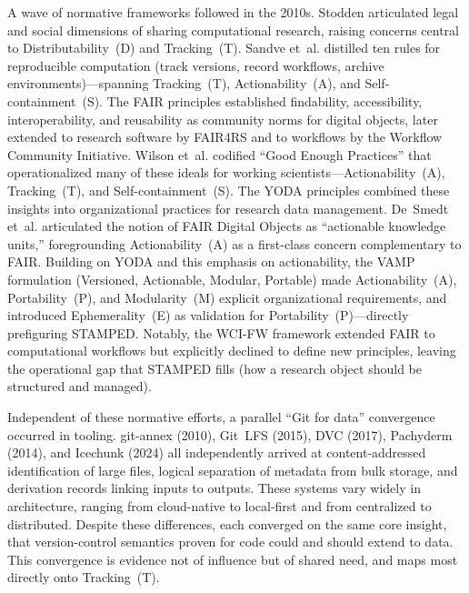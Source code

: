 \documentclass{article}
\begin{document}
A wave of normative frameworks followed in the 2010s.
Stodden\cite{stodden_scientific_2010} articulated legal and social dimensions of sharing computational research, raising concerns central to Distributability~(D) and Tracking~(T).
Sandve et~al.\cite{sandve_ten_2013} distilled ten rules for reproducible computation (track versions, record workflows, archive environments)---spanning Tracking~(T), Actionability~(A), and Self-containment~(S).
The FAIR principles\cite{wilkinson_fair_2016} established findability, accessibility, interoperability, and reusability as community norms for digital objects, later extended to research software by FAIR4RS\cite{barker_introducing_2022} and to workflows by the Workflow Community Initiative\cite{wilkinson_applying_2025}.
Wilson et~al.\cite{wilson_good_2017} codified ``Good Enough Practices'' that operationalized many of these ideals for working scientists---Actionability~(A), Tracking~(T), and Self-containment~(S).
The YODA principles\cite{hanke_yoda_2018} combined these insights into organizational practices for research data management.
De~Smedt et~al.\cite{de_smedt_fair_2020} articulated the notion of FAIR Digital Objects as ``actionable knowledge units,'' foregrounding Actionability~(A) as a first-class concern complementary to FAIR.
Building on YODA and this emphasis on actionability, the VAMP formulation\cite{hanke_what_2023} (Versioned, Actionable, Modular, Portable) made Actionability~(A), Portability~(P), and Modularity~(M) explicit organizational requirements, and introduced Ephemerality~(E) as validation for Portability~(P)---directly prefiguring STAMPED.
Notably, the WCI-FW framework\cite{wilkinson_applying_2025} extended FAIR to computational workflows but explicitly declined to define new principles, leaving the operational gap  that STAMPED fills (how a research object should be structured and managed).

Independent of these normative efforts, a parallel ``Git for data'' convergence occurred in tooling.
git-annex (2010), Git~LFS (2015), DVC (2017), Pachyderm (2014), and Icechunk\cite{abernathey_icechunk_2024} (2024) all independently arrived at content-addressed identification of large files, logical separation of metadata from bulk storage, and derivation records linking inputs to outputs.
These systems vary widely in architecture, ranging from cloud-native to local-first and from centralized to distributed.
Despite these differences, each converged on the same core insight, that version-control semantics proven for code could and should extend to data.
This convergence is evidence not of influence but of shared need, and maps most directly onto Tracking~(T).
\end{document}
